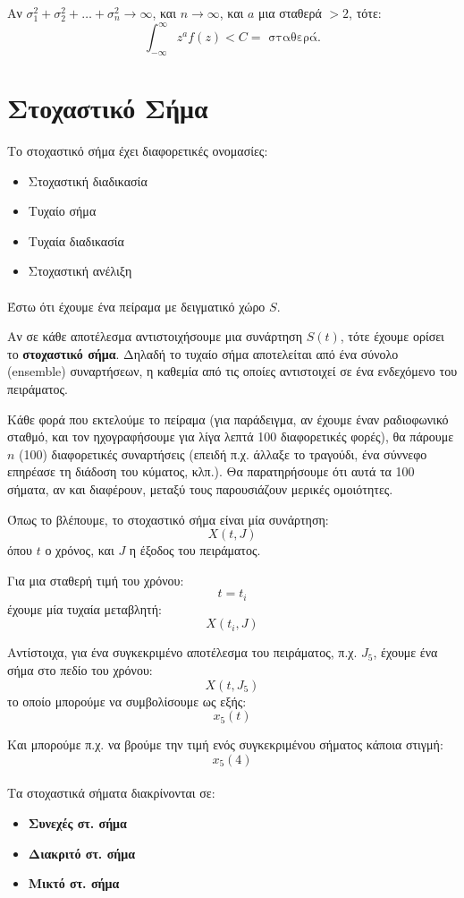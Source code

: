 \documentclass[11pt,a4paper,notitlepage,fleqn,final]{article}
\begin{document}
Αν \( \sigma_1^2+\sigma_2^2+\dots+\sigma_n^2 \to \infty \), και
\( n\to \infty \), και \( a \) μια σταθερά \( >2 \), τότε:
\[
\int_{-\infty}^{\infty} z^a f(z) < C = \text{ σταθερά.}
\]

\section{Στοχαστικό Σήμα}
Το στοχαστικό σήμα έχει διαφορετικές ονομασίες:
\begin{itemize}
	\item Στοχαστική διαδικασία
	\item Τυχαίο σήμα
	\item Τυχαία διαδικασία
	\item Στοχαστική ανέλιξη
\end{itemize}

\paragraph{}
Έστω ότι έχουμε ένα πείραμα με δειγματικό χώρο \( S \).

Αν σε κάθε αποτέλεσμα αντιστοιχήσουμε μια συνάρτηση
\( S(t) \), τότε έχουμε ορίσει το \textbf{στοχαστικό σήμα}.
Δηλαδή το τυχαίο σήμα αποτελείται από ένα σύνολο (ensemble)
συναρτήσεων, η καθεμία από τις οποίες αντιστοιχεί σε ένα
ενδεχόμενο του πειράματος.

Κάθε φορά που εκτελούμε το πείραμα (για παράδειγμα, αν έχουμε
έναν ραδιοφωνικό σταθμό, και τον ηχογραφήσουμε για λίγα λεπτά 100
διαφορετικές φορές), θα πάρουμε \( n \) (100) διαφορετικές
συναρτήσεις (επειδή π.χ. άλλαξε το τραγούδι, ένα σύννεφο επηρέασε
τη διάδοση του κύματος, κλπ.). Θα παρατηρήσουμε ότι αυτά τα 100
σήματα, αν και διαφέρουν, μεταξύ τους παρουσιάζουν μερικές
ομοιότητες.

Όπως το βλέπουμε, το στοχαστικό σήμα είναι μία συνάρτηση:
\[
X(t,J)
\]
όπου \( t \) ο χρόνος, και \( J \) η έξοδος του πειράματος.

Για μια σταθερή τιμή του χρόνου:
\[
t=t_i
\]
έχουμε μία τυχαία μεταβλητή:
\[
X(t_i,J)
\]

Αντίστοιχα, για ένα συγκεκριμένο αποτέλεσμα του πειράματος, π.χ.
\( J_5 \), έχουμε ένα σήμα στο πεδίο του χρόνου:
\[
X(t,J_5)
\]
το οποίο μπορούμε να συμβολίσουμε ως εξής:
\[
x_5(t)
\]

Και μπορούμε π.χ. να βρούμε την τιμή ενός συγκεκριμένου
σήματος κάποια στιγμή:
\[
x_5(4)
\]

\paragraph{}
Τα στοχαστικά σήματα διακρίνονται σε:
\begin{itemize}
	\item \textbf{Συνεχές στ. σήμα}
	\item \textbf{Διακριτό στ. σήμα}
	\item \textbf{Μικτό στ. σήμα}
\end{itemize}
\end{document}
